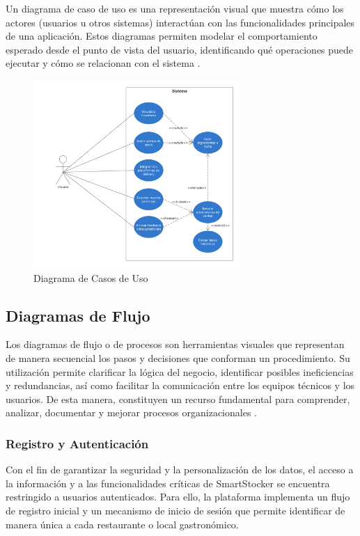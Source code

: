 Un diagrama de caso de uso es una representación visual que muestra cómo los actores (usuarios u otros sistemas) interactúan con las funcionalidades principales de una aplicación. Estos diagramas permiten modelar el comportamiento esperado desde el punto de vista del usuario, identificando qué operaciones puede ejecutar y cómo se relacionan con el sistema \parencite{jacobson1992usecase}.
\begin{figure}[htbp]
    \centering
    \includegraphics[width=0.7\textwidth]{images/DiagramaCasosDeUsoTesis.png}
    \caption{Diagrama de Casos de Uso}
    \label{fig:casos-de-uso}
\end{figure}

\subsection{Diagramas de Flujo}\label{sec:diagramas-flujo}

Los diagramas de flujo o de procesos son herramientas visuales que representan de manera secuencial los pasos y decisiones que conforman un procedimiento. Su utilización permite clarificar la lógica del negocio, identificar posibles ineficiencias y redundancias, así como facilitar la comunicación entre los equipos técnicos y los usuarios. De esta manera, constituyen un recurso fundamental para comprender, analizar, documentar y mejorar procesos organizacionales \parencite{asq2025flowchart}.

\subsubsection{Registro y Autenticación}

Con el fin de garantizar la seguridad y la personalización de los datos, el acceso a la información y a las funcionalidades críticas de SmartStocker se encuentra restringido a usuarios autenticados. Para ello, la plataforma implementa un flujo de registro inicial y un mecanismo de inicio de sesión que permite identificar de manera única a cada restaurante o local gastronómico.

